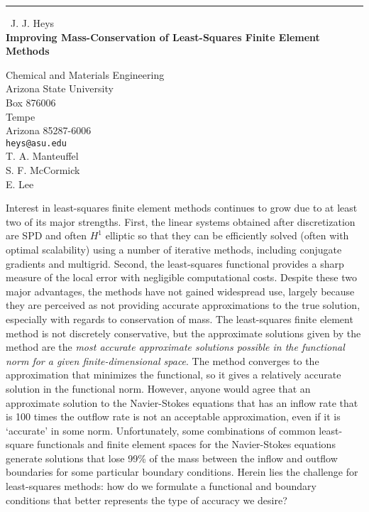 \documentclass{report}
\begin{document}
\begin{center}
\rule{6in}{1pt} \
{\large J. J. Heys \\
{\bf Improving Mass-Conservation of Least-Squares Finite Element Methods}}

Chemical and Materials Engineering \\ Arizona State University \\ Box 876006 \\ Tempe \\ Arizona 85287-6006
\\
{\tt heys@asu.edu}\\
T. A. Manteuffel\\
S. F. McCormick\\
	E. Lee\end{center}

Interest in least-squares finite element methods continues to grow due to
at least two of its major strengths. First, the linear systems obtained
after discretization are SPD and often $H^1$ elliptic so that they can be
efficiently solved (often with optimal scalability) using a number of
iterative methods, including conjugate gradients and multigrid. Second,
the least-squares functional provides a sharp measure of the local error
with negligible computational costs. Despite these two major advantages,
the methods have not gained widespread use, largely because they are
perceived as not providing accurate approximations to the true solution,
especially with regards to conservation of mass. The least-squares finite
element method is not discretely conservative, but the approximate
solutions given by the method are the \emph{most accurate approximate
solutions possible in the functional norm for a given finite-dimensional
space}. The method converges to the approximation that minimizes the
functional, so it gives a relatively accurate solution in the functional
norm. However, anyone would agree that an approximate solution to the
Navier-Stokes equations that has an inflow rate that is 100 times the
outflow rate is not an acceptable approximation, even if it is `accurate'
in some norm. Unfortunately, some combinations of common least-square
functionals and finite element spaces for the Navier-Stokes equations
generate solutions that lose 99\% of the mass between the inflow and
outflow boundaries for some particular boundary conditions. Herein lies
the challenge for least-squares methods: how do we formulate a functional
and boundary conditions that better represents the type of accuracy we
desire?
\end{document}
